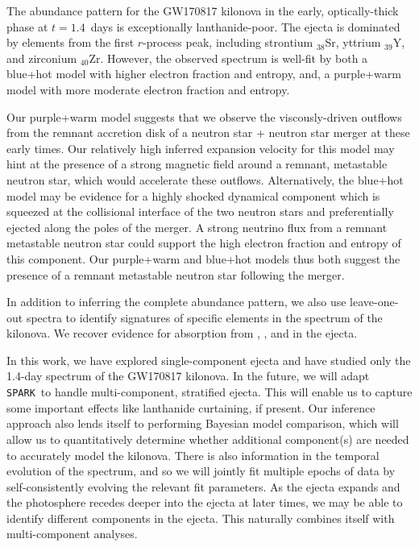 \documentclass[twocolumn, twocolappendix]{aastex63}
\def\SPARK{\texttt{SPARK}}
\begin{document}
The abundance pattern for the GW170817 kilonova in the early, optically-thick phase at $t=1.4$~days is exceptionally lanthanide-poor. The ejecta is dominated by elements from the first $r$-process peak, including strontium ${}_{38}$Sr, yttrium ${}_{39}$Y, and zirconium ${}_{40}$Zr. However, the observed spectrum is well-fit by both a blue+hot model with higher electron fraction and entropy, and, a purple+warm model with more moderate electron fraction and entropy. 

Our purple+warm model suggests that we observe the viscously-driven outflows from the remnant accretion disk of a neutron star + neutron star merger at these early times. Our relatively high inferred expansion velocity for this model may hint at the presence of a strong magnetic field around a remnant, metastable neutron star, which would accelerate these outflows. Alternatively, the blue+hot model may be evidence for a highly shocked dynamical component which is squeezed at the collisional interface of the two neutron stars and preferentially ejected along the poles of the merger. A strong neutrino flux from a remnant metastable neutron star could support the high electron fraction and entropy of this component. Our purple+warm and blue+hot models thus both suggest the presence of a remnant metastable neutron star following the merger.

In addition to inferring the complete abundance pattern, we also use leave-one-out spectra to identify signatures of specific elements in the spectrum of the kilonova. We recover evidence for absorption from , , and  in the ejecta. 

In this work, we have explored single-component ejecta and have studied only the 1.4-day spectrum of the GW170817 kilonova. In the future, we will adapt \SPARK~to handle multi-component, stratified ejecta. This will enable us to capture some important effects like lanthanide curtaining, if present. Our inference approach also lends itself to performing Bayesian model comparison, which will allow us to quantitatively determine whether additional component(s) are needed to accurately model the kilonova. There is also information in the temporal evolution of the spectrum, and so we will jointly fit multiple epochs of data by self-consistently evolving the relevant fit parameters. As the ejecta expands and the photosphere recedes deeper into the ejecta at later times, we may be able to identify different components in the ejecta. This naturally combines itself with multi-component analyses.
\end{document}
